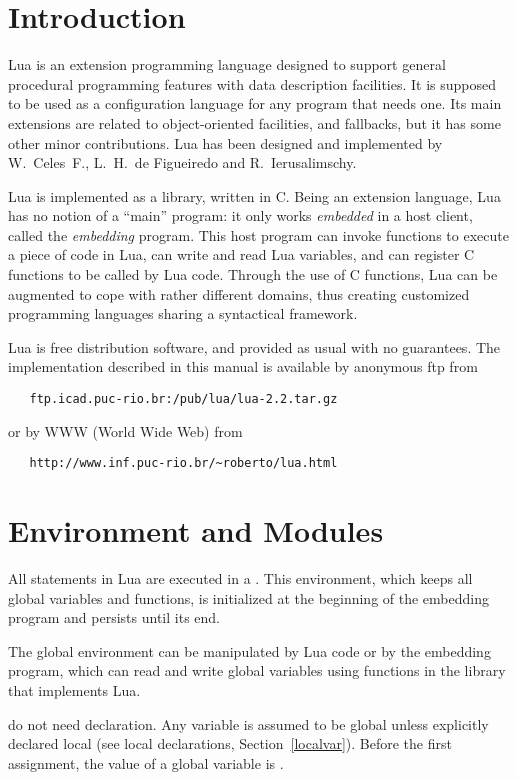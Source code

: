 \section{Introduction}

Lua is an extension programming language designed to support
general procedural programming features with data description
facilities.
It is supposed to be used as a configuration language for any
program that needs one.
Its main extensions are related to object-oriented facilities,
and fallbacks,
but it has some other minor contributions.
Lua has been designed and implemented by
W.~Celes~F., L.~H.~de Figueiredo and R.~Ierusalimschy.

Lua is implemented as a library, written in C.
Being an extension language, Lua has no notion of a ``main'' program:
it only works {\em embedded} in a host client,
called the {\em embedding} program.
This host program can invoke functions to execute a piece of
code in Lua, can write and read Lua variables,
and can register C functions to be called by Lua code.
Through the use of C functions, Lua can be augmented to cope with
rather different domains,
thus creating customized programming languages sharing a syntactical framework.

Lua is free distribution software,
and provided as usual with no guarantees.
The implementation described in this manual is available
by anonymous ftp from
\begin{verbatim}
   ftp.icad.puc-rio.br:/pub/lua/lua-2.2.tar.gz
\end{verbatim}
or by WWW (World Wide Web) from
\begin{verbatim}
   http://www.inf.puc-rio.br/~roberto/lua.html
\end{verbatim}


\section{Environment and Modules}

All statements in Lua are executed in a .
This environment, which keeps all global variables and functions,
is initialized at the beginning of the embedding program and
persists until its end.

The global environment can be manipulated by Lua code or
by the embedding program,
which can read and write global variables
using functions in the library that implements Lua.

 do not need declaration.
Any variable is assumed to be global unless explicitly declared local
(see local declarations, Section~\ref{localvar}).
Before the first assignment, the value of a global variable is \nil.

